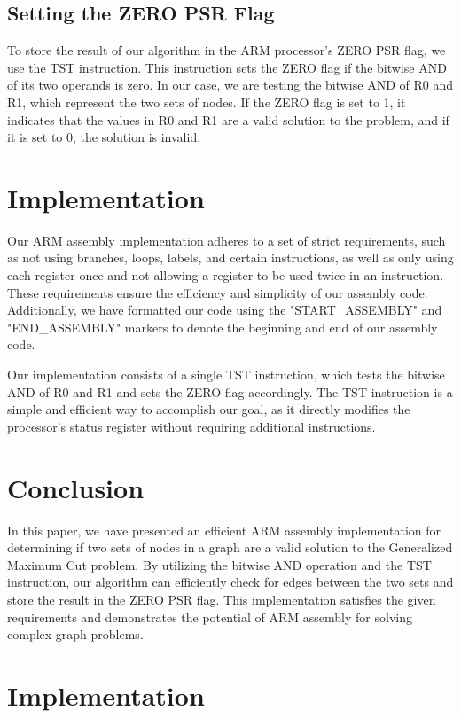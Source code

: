 \subsection{Setting the ZERO PSR Flag}
To store the result of our algorithm in the ARM processor's ZERO PSR flag, we use the TST instruction. This instruction sets the ZERO flag if the bitwise AND of its two operands is zero. In our case, we are testing the bitwise AND of R0 and R1, which represent the two sets of nodes. If the ZERO flag is set to 1, it indicates that the values in R0 and R1 are a valid solution to the problem, and if it is set to 0, the solution is invalid.

\section{Implementation}
Our ARM assembly implementation adheres to a set of strict requirements, such as not using branches, loops, labels, and certain instructions, as well as only using each register once and not allowing a register to be used twice in an instruction. These requirements ensure the efficiency and simplicity of our assembly code. Additionally, we have formatted our code using the "START\_ASSEMBLY" and "END\_ASSEMBLY" markers to denote the beginning and end of our assembly code.

Our implementation consists of a single TST instruction, which tests the bitwise AND of R0 and R1 and sets the ZERO flag accordingly. The TST instruction is a simple and efficient way to accomplish our goal, as it directly modifies the processor's status register without requiring additional instructions.

\section{Conclusion}
In this paper, we have presented an efficient ARM assembly implementation for determining if two sets of nodes in a graph are a valid solution to the Generalized Maximum Cut problem. By utilizing the bitwise AND operation and the TST instruction, our algorithm can efficiently check for edges between the two sets and store the result in the ZERO PSR flag. This implementation satisfies the given requirements and demonstrates the potential of ARM assembly for solving complex graph problems.



\section{Implementation}

